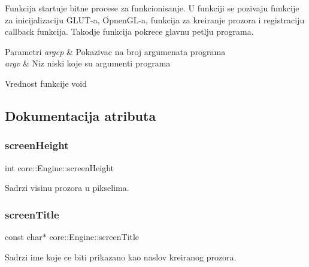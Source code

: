 Funkcija startuje bitne procese za funkcionisanje. U funkciji se pozivaju funkcije za inicijalizaciju G\+L\+U\+T-\/a, Opnen\+G\+L-\/a, funkcija za kreiranje prozora i registraciju callback funkcija. Takodje funkcija pokrece glavnu petlju programa. 


\begin{DoxyParams}{Parametri}
{\em argcp} & Pokazivac na broj argumenata programa \\
\hline
{\em argv} & Niz niski koje su argumenti programa \\
\hline
\end{DoxyParams}
\begin{DoxyReturn}{Vrednost funkcije}
void 
\end{DoxyReturn}


\subsection{Dokumentacija atributa}
\mbox{\label{classcore_1_1Engine_a40fe67e2a2dbbc34c1955fa2b28d87bc}} 
\subsubsection{\texorpdfstring{screen\+Height}{screenHeight}}
{\footnotesize\ttfamily int core\+::\+Engine\+::screen\+Height\hspace{0.3cm}{\ttfamily [private]}}



Sadrzi visinu prozora u pikselima. 

\mbox{\label{classcore_1_1Engine_ad695d2314128b2500074282b10139804}} 
\subsubsection{\texorpdfstring{screen\+Title}{screenTitle}}
{\footnotesize\ttfamily const char$\ast$ core\+::\+Engine\+::screen\+Title\hspace{0.3cm}{\ttfamily [private]}}



Sadrzi ime koje ce biti prikazano kao naslov kreiranog prozora. 


